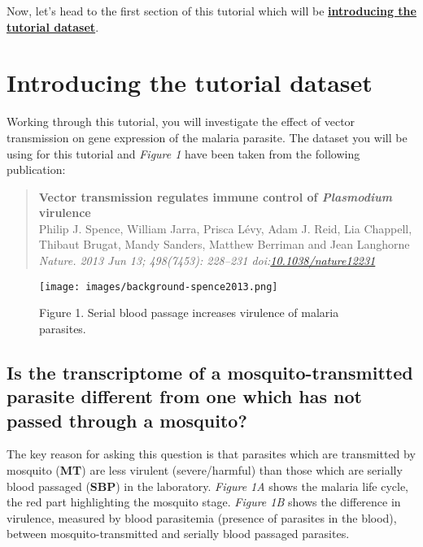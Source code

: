\documentclass[11pt]{article}
\begin{document}
    Now, let's head to the first section of this tutorial which will be
\textbf{\href{dataset-intro.ipynb}{introducing the tutorial dataset}}.





\newpage





    \hypertarget{introducing-the-tutorial-dataset}{%
\section{Introducing the tutorial
dataset}\label{introducing-the-tutorial-dataset}}

    Working through this tutorial, you will investigate the effect of vector
transmission on gene expression of the malaria parasite. The dataset you
will be using for this tutorial and \textit{Figure 1} have been taken from
the following publication:

    \begin{quote}
\textbf{Vector transmission regulates immune control of
\textit{Plasmodium} virulence}\\
Philip J. Spence, William Jarra, Prisca Lévy, Adam J. Reid, Lia
Chappell, Thibaut Brugat, Mandy Sanders, Matthew Berriman and Jean
Langhorne\\
\textit{Nature. 2013 Jun 13; 498(7453): 228--231
doi:\href{https://www.nature.com/articles/nature12231}{10.1038/nature12231}}
\end{quote}

    \begin{figure}[!h]
\centering
\texttt{[image: images/background-spence2013.png]}
\caption{Figure 1. Serial blood passage increases virulence of malaria
parasites.}
\end{figure}

    \hypertarget{is-the-transcriptome-of-a-mosquito-transmitted-parasite-different-from-one-which-has-not-passed-through-a-mosquito}{%
\subsection{Is the transcriptome of a mosquito-transmitted parasite
different from one which has not passed through a
mosquito?}\label{is-the-transcriptome-of-a-mosquito-transmitted-parasite-different-from-one-which-has-not-passed-through-a-mosquito}}

    The key reason for asking this question is that parasites which are
transmitted by mosquito (\textbf{MT}) are less virulent (severe/harmful)
than those which are serially blood passaged (\textbf{SBP}) in the
laboratory. \textit{Figure 1A} shows the malaria life cycle, the red part
highlighting the mosquito stage. \textit{Figure 1B} shows the difference
in virulence, measured by blood parasitemia (presence of parasites in
the blood), between mosquito-transmitted and serially blood passaged
parasites.
\end{document}
